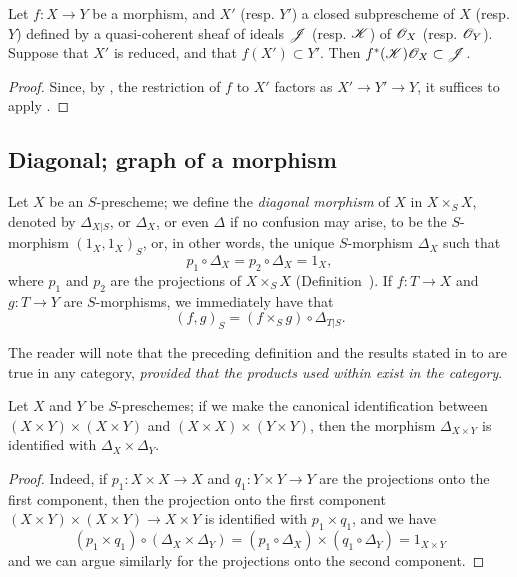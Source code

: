 \begin{corollary}[5.2.4]
\label{I.5.2.4}
Let $f:X\to Y$ be a morphism, and $X'$ (resp. $Y'$) a closed subprescheme of $X$ (resp. $Y$) defined by a quasi-coherent sheaf of ideals $\mathscr{J}$ (resp. $\mathscr{K}$) of $\mathscr{O}_X$ (resp. $\mathscr{O}_Y$).
Suppose that $X'$ is reduced, and that $f(X')\subset Y'$.
Then $f^*(\mathscr{K})\mathscr{O}_X\subset\mathscr{J}$.
\end{corollary}

\begin{proof}
Since, by , the restriction of $f$ to $X'$ factors as $X'\to Y'\to Y$, it suffices to apply .
\end{proof}

\subsection{Diagonal; graph of a morphism}
\label{subsection:I.5.3}

\begin{env}[5.3.1]
\label{I.5.3.1}
Let $X$ be an $S$-prescheme;
we define the \emph{diagonal morphism} of $X$ in $X\times_S X$, denoted by $\Delta_{X|S}$, or $\Delta_X$, or even $\Delta$ if no confusion may arise, to be the $S$-morphism $(1_X,1_X)_S$, or, in other words, the unique $S$-morphism $\Delta_X$ such that
\[
\label{I.5.3.1.1}
  p_1\circ\Delta_X=p_2\circ\Delta_X=1_X,
  \tag{5.3.1.1}
\]
where $p_1$ and $p_2$ are the projections of $X\times_S X$ (Definition~).
If $f:T\to X$ and $g:T\to Y$ are $S$-morphisms, we immediately have that
\[
\label{I.5.3.1.2}
  (f,g)_S=(f\times_S g)\circ\Delta_{T|S}.
  \tag{5.3.1.2}
\]

The reader will note that the preceding definition and the results stated in  to  are true in any category, \emph{provided that the products used within exist in the category}.
\end{env}

\begin{proposition}[5.3.2]
\label{I.5.3.2}
Let $X$ and $Y$ be $S$-preschemes;
if we make the canonical identification between $(X\times Y)\times(X\times Y)$ and $(X\times X)\times(Y\times Y)$, then the morphism $\Delta_{X\times Y}$ is identified with $\Delta_X\times\Delta_Y$.
\end{proposition}

\begin{proof}
Indeed, if $p_1:X\times X\to X$ and $q_1:Y\times Y\to Y$ are the projections onto the first component, then the projection onto the first component $(X\times Y)\times(X\times Y)\to X\times Y$ is identified with $p_1\times q_1$, and we have
\[
  (p_1\times q_1)\circ(\Delta_X\times\Delta_Y)=(p_1\circ\Delta_X)\times(q_1\circ\Delta_Y)=1_{X\times Y}
\]
and we can argue similarly for the projections onto the second component.
\end{proof}

